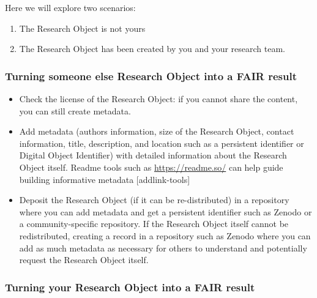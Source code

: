 \documentclass[
  letterpaper,
  DIV=11,
  numbers=noendperiod]{scrreport}
\providecommand{\tightlist}{%
  \setlength{\itemsep}{0pt}\setlength{\parskip}{0pt}}\usepackage{longtable,booktabs,array}
\begin{document}
Here we will explore two scenarios:

\begin{enumerate}
\def\labelenumi{\arabic{enumi}.}
\tightlist
\item
  The Research Object is not yours
\item
  The Research Object has been created by you and your research team.
\end{enumerate}

\hypertarget{turning-someone-else-research-object-into-a-fair-result}{%
\subsubsection{Turning someone else Research Object into a FAIR
result}\label{turning-someone-else-research-object-into-a-fair-result}}

\begin{itemize}
\tightlist
\item
  Check the license of the Research Object: if you cannot share the
  content, you can still create metadata.
\item
  Add metadata (authors information, size of the Research Object,
  contact information, title, description, and location such as a
  persistent identifier or Digital Object Identifier) with detailed
  information about the Research Object itself. Readme tools such as
  \url{https://readme.so/} can help guide building informative metadata
  {[}addlink-tools{]}
\item
  Deposit the Research Object (if it can be re-distributed) in a
  repository where you can add metadata and get a persistent identifier
  such as Zenodo or a community-specific repository. If the Research
  Object itself cannot be redistributed, creating a record in a
  repository such as Zenodo where you can add as much metadata as
  necessary for others to understand and potentially request the
  Research Object itself.
\end{itemize}

\hypertarget{turning-your-research-object-into-a-fair-result}{%
\subsubsection{Turning your Research Object into a FAIR
result}\label{turning-your-research-object-into-a-fair-result}}
\end{document}
